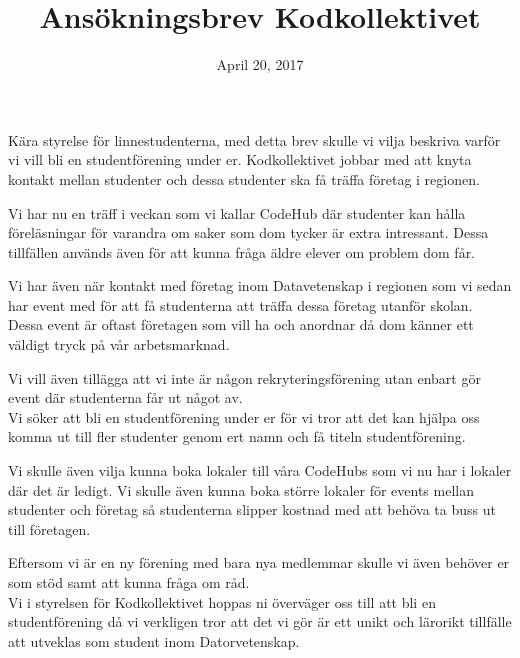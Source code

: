\documentclass[a4paper,11pt]{article}
\begin{document}
	

\title{Ansökningsbrev Kodkollektivet}
\date{April 20, 2017}
\maketitle

\noindent Kära styrelse för linnestudenterna, med detta brev skulle vi vilja beskriva varför vi vill bli en studentförening under er.
Kodkollektivet jobbar med att knyta kontakt mellan studenter och dessa studenter ska få träffa företag i regionen. 

Vi har nu en träff i veckan som vi kallar CodeHub där studenter kan hålla föreläsningar för varandra om saker som dom tycker är extra intressant. Dessa tillfällen används även för att kunna fråga äldre elever om problem dom får.

Vi har även när kontakt med företag inom Datavetenskap i regionen som vi sedan har event med för att få studenterna att träffa dessa företag utanför skolan. Dessa event är oftast företagen som vill ha och anordnar då dom känner ett väldigt tryck på vår arbetsmarknad.

Vi vill även tillägga att vi inte är någon rekryteringsförening utan enbart gör event där studenterna får ut något av.
\\

\noindent Vi söker att bli en studentförening under er för vi tror att det kan hjälpa oss komma ut till fler studenter genom ert namn och få titeln studentförening.

Vi skulle även vilja kunna boka lokaler till våra CodeHubs som vi nu har i lokaler där det är ledigt. Vi skulle även kunna boka större lokaler för events mellan studenter och företag så studenterna slipper kostnad med att behöva ta buss ut till företagen. 

Eftersom vi är en ny förening med bara nya medlemmar skulle vi även behöver er som stöd samt att kunna fråga om råd.  
\\

\noindent Vi i styrelsen för Kodkollektivet hoppas ni överväger oss till att bli en studentförening då vi verkligen tror att det vi gör är ett unikt och lärorikt tillfälle att utveklas som student inom Datorvetenskap. \\[2cm]

\end{document}
